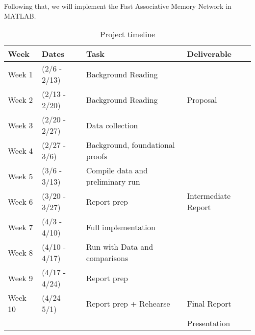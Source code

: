 Following that, we will implement the Fast Associative Memory Network in MATLAB.








\begin{table*}[t]
  \caption{Project timeline}
  \label{tab:freq}
  \begin{tabular}{llll}
    \toprule
    Week & Dates & Task & Deliverable\\
    \midrule
    Week 1 & (2/6   - 2/13) & Background Reading & \\
    Week 2 & (2/13  - 2/20) & Background Reading & Proposal\\
    Week 3 & (2/20  - 2/27) & Data collection & \\
    Week 4 & (2/27  - 3/6)  & Background, foundational proofs & \\
    Week 5 & (3/6   - 3/13) & Compile data and preliminary run & \\
    Week 6 & (3/20  - 3/27) & Report prep & Intermediate Report\\
    Week 7 & (4/3   - 4/10) & Full implementation & \\
    Week 8 & (4/10  - 4/17) & Run with Data and comparisons & \\
    Week 9 & (4/17  - 4/24) & Report prep & \\
    Week 10 & (4/24 - 5/1) & Report prep + Rehearse & Final Report \\
    & & & Presentation\\
  \bottomrule
\end{tabular}
\end{table*}
